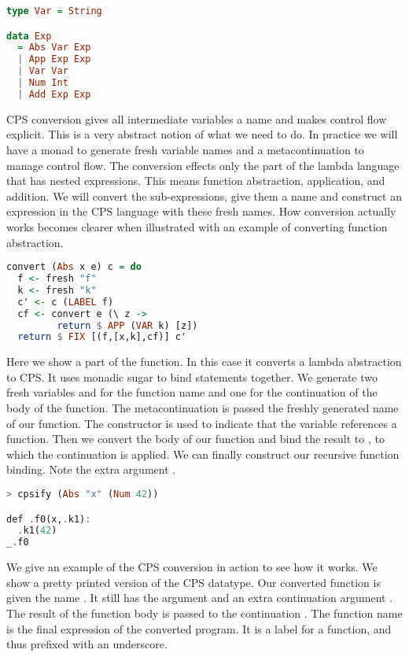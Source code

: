 \begin{lstlisting}[language=Haskell]
type Var = String

data Exp
  = Abs Var Exp
  | App Exp Exp
  | Var Var
  | Num Int
  | Add Exp Exp
\end{lstlisting}

\ac{CPS} conversion gives all intermediate variables a name and makes control flow explicit. This is a very abstract notion of what we need to do. In practice we will have a monad to generate fresh variable names and a metacontinuation to manage control flow. The conversion effects only the part of the lambda language that has nested expressions. This means function abstraction, application, and addition. We will convert the sub-expressions, give them a name and construct an expression in the \ac{CPS} language with these fresh names. How conversion actually works becomes clearer when illustrated with an example of converting function abstraction.

\begin{lstlisting}[language=Haskell]
convert (Abs x e) c = do
  f <- fresh "f"
  k <- fresh "k"
  c' <- c (LABEL f)
  cf <- convert e (\ z ->
         return $ APP (VAR k) [z])
  return $ FIX [(f,[x,k],cf)] c'
\end{lstlisting}

Here we show a part of the  function. In this case it converts a lambda abstraction to \ac{CPS}. It uses monadic sugar to bind statements together. We generate two fresh variables  and  for the function name and one for the continuation of the body of the function. The metacontinuation  is passed the freshly generated name of our function. The  constructor is used to indicate that the variable references a function. Then we convert the body of our function and bind the result to , to which the continuation  is applied. We can finally construct our recursive function binding. Note the extra argument .

\begin{lstlisting}[language=Haskell]
> cpsify (Abs "x" (Num 42))

def .f0(x,.k1):
  .k1(42)
_.f0
\end{lstlisting}

We give an example of the \ac{CPS} conversion in action to see how it works. We show a pretty printed version of the \ac{CPS} datatype. Our converted function is given the name . It still has the argument  and an extra continuation argument . The result of the function body is passed to the continuation . The function name is the final expression of the converted program. It is a label for a function, and thus prefixed with an underscore.

